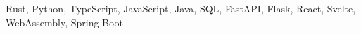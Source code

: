 Rust, Python, TypeScript, JavaScript, Java, SQL, FastAPI, Flask, React, Svelte, WebAssembly, Spring Boot
